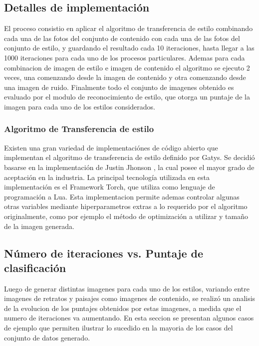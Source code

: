 \documentclass[a4paper,11pt,spanish]{book}
\begin{document}
    \subsection{Detalles de implementación}
      El proceso consistio en aplicar el algoritmo de transferencia de estilo combinando cada una de las fotos del conjunto de contenido con cada una de las fotos del conjunto de estilo,
      y guardando el resultado cada 10 iteraciones, hasta llegar a las 1000 iteraciones para cada uno de los procesos particulares.
      Ademas para cada combinacion de imagen de estilo e imagen de contenido el algoritmo se ejecuto 2 veces, una comenzando desde la imagen de contenido y otra comenzando desde una imagen de ruido.
      Finalmente todo el conjunto de imagenes obtenido es evaluado por el modulo de reconocimiento de estilo, que otorga un puntaje de la imagen para cada uno de los estilos considerados.
      \subsubsection{Algoritmo de Transferencia de estilo}
	Existen una gran variedad de implementaciónes de código abierto que implementan el algoritmo de transferencia de estilo definido por Gatys.
	Se decidió basarse en la implementación de Justin Jhonson \cite{Johnson:Neural_Style}, la cual posee el mayor grado de aceptación en la industria.
	La principal tecnología utilizada en esta implementación es el Framework Torch, que utiliza como lenguaje de programación a Lua.
	Esta implementacion permite ademas controlar algunas otras variables mediante hiperparametros extras a lo requerido por el algoritmo originalmente, 
	como por ejemplo el método de optimización a utilizar y tamaño de la imagen generada.

    \subsection{Número de iteraciones vs. Puntaje de clasificación}
      Luego de generar distintas imagenes para cada uno de los estilos, variando entre imagenes de retratos y paisajes como imagenes de contenido, se realizó un analisis
      de la evolucion de los puntajes obtenidos por estas imagenes, a medida que el numero de iteraciones va aumentando. En esta seccion se presentan algunos casos de ejemplo
      que permiten ilustrar lo sucedido en la mayoria de los casos del conjunto de datos generado.
      
\end{document}
